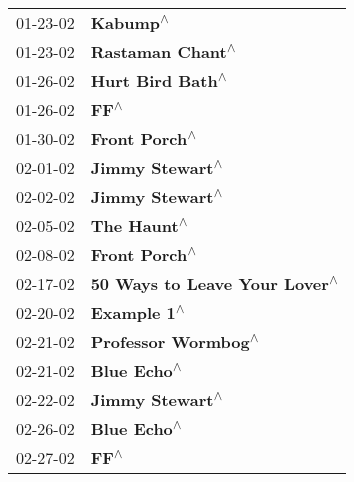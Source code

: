 \begin{supertabular}{p{0.25\columnwidth}p{0.75\columnwidth}}
 01-23-02 &                                                                   \textbf{Kabump\textsuperscript{$\wedge$}} \\
 01-23-02 &                                                           \textbf{Rastaman Chant\textsuperscript{$\wedge$}} \\
 01-26-02 &                                                           \textbf{Hurt Bird Bath\textsuperscript{$\wedge$}} \\
 01-26-02 &                                                                       \textbf{FF\textsuperscript{$\wedge$}} \\
 01-30-02 &                                                              \textbf{Front Porch\textsuperscript{$\wedge$}} \\
 02-01-02 &                                                            \textbf{Jimmy Stewart\textsuperscript{$\wedge$}} \\
 02-02-02 &                                                            \textbf{Jimmy Stewart\textsuperscript{$\wedge$}} \\
 02-05-02 &                                                                \textbf{The Haunt\textsuperscript{$\wedge$}} \\
 02-08-02 &                                                              \textbf{Front Porch\textsuperscript{$\wedge$}} \\
 02-17-02 &                                              \textbf{50 Ways to Leave Your Lover\textsuperscript{$\wedge$}} \\
 02-20-02 &                                                                \textbf{Example 1\textsuperscript{$\wedge$}} \\
 02-21-02 &                                                        \textbf{Professor Wormbog\textsuperscript{$\wedge$}} \\
 02-21-02 &                                                                \textbf{Blue Echo\textsuperscript{$\wedge$}} \\
 02-22-02 &                                                            \textbf{Jimmy Stewart\textsuperscript{$\wedge$}} \\
 02-26-02 &                                                                \textbf{Blue Echo\textsuperscript{$\wedge$}} \\
 02-27-02 &                                                                       \textbf{FF\textsuperscript{$\wedge$}} \\

\end{supertabular}
